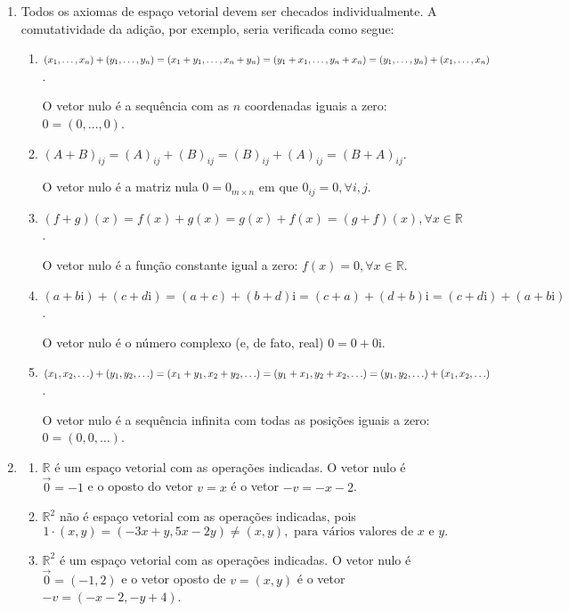 \documentclass[12pt,a4paper]{article}
\newcommand\ii{\mathrm{i}}
\newcommand*\R{\mathbb{R}}
\begin{document}
\begin{enumerate}
\item Todos os axiomas de espaço vetorial devem ser checados individualmente. A comutatividade da adição, por exemplo, seria verificada como segue:
\begin{enumerate}
\item
$(x_1, \ldots, x_n) + (y_1, \ldots, y_n)
= (x_1 + y_1, \ldots, x_n + y_n) \\
= (y_1 + x_1, \ldots, y_n + x_n)
= (y_1, \ldots, y_n) + (x_1, \ldots, x_n)$.

O vetor nulo é a sequência com as $n$ coordenadas iguais a zero: $0 = (0, \ldots, 0)$.

\item
$(A + B)_{ij}
= (A)_{ij} + (B)_{ij}
= (B)_{ij} + (A)_{ij}
= (B + A)_{ij}$.

O vetor nulo é a matriz nula $0 = 0_{m \times n}$ em que $0_{ij} = 0, \forall i,j$.

\item
$(f + g)(x)
= f(x) + g(x)
= g(x) + f(x)
= (g + f)(x), \forall x \in \R$.

O vetor nulo é a função constante igual a zero: $f(x) = 0, \forall x \in \R$.

\item
$(a + b \ii)+ (c + d \ii)
= (a + c) + (b + d) \ii
= (c + a) + (d + b) \ii
= (c + d \ii) + (a + b \ii)$.

O vetor nulo é o número complexo (e, de fato, real) $0 = 0 + 0 \ii$.

\item
$(x_1, x_2, \ldots) + (y_1, y_2, \ldots)
= (x_1 + y_1, x_2 + y_2, \ldots) \\
= (y_1 + x_1, y_2 + x_2, \ldots)
= (y_1, y_2, \ldots) + (x_1, x_2, \ldots)$.

O vetor nulo é a sequência infinita com todas as posições iguais a zero: $0 = (0, 0, \ldots)$.

\end{enumerate}

\item
\begin{enumerate}
\item $\R$ é um espaço vetorial com as operações indicadas. O vetor nulo é $\vec{0} = -1$ e o oposto do vetor $v = x$ é o vetor $-v = -x-2$.
\item $\R^2$ não é espaço vetorial com as operações indicadas, pois
\[1 \cdot(x,y) = (-3x+y,5x-2y) \neq (x,y), \text{ para vários valores de }x \text{ e }y.\]
\item $\R^2$ é um espaço vetorial com as operações indicadas. O vetor nulo é $\vec{0} = (-1, 2)$ e o vetor oposto de $v = (x,y)$ é o vetor $-v = (-x-2, -y+4)$.
\end{enumerate}



\end{enumerate}
\end{document}

